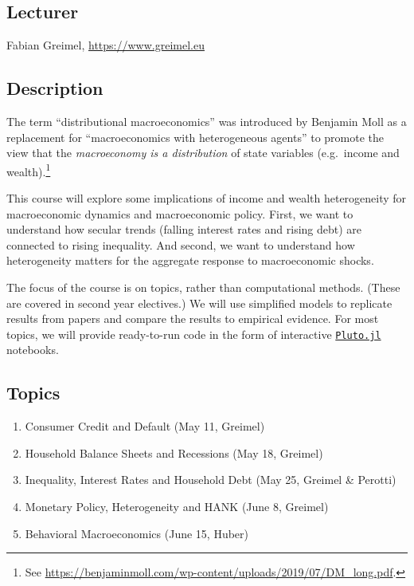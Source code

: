 \documentclass[a4paper,12pt]{article}
\begin{document}

\medskip {}

\subsection*{Lecturer}

Fabian Greimel, \url{https://www.greimel.eu}


\subsection*{Description}

The term ``distributional macroeconomics'' was introduced by Benjamin Moll as a replacement for ``macroeconomics with heterogeneous agents'' to promote the view that the \emph{macroeconomy is a distribution} of state variables (e.g.\ income and wealth).\footnote{See \url{ https://benjaminmoll.com/wp-content/uploads/2019/07/DM_long.pdf}.}

This course will explore some implications of income and wealth heterogeneity for macroeconomic dynamics and macroeconomic policy. First, we want to understand how secular trends (falling interest rates and rising debt) are connected to rising inequality. And second, we want to understand how heterogeneity matters for the aggregate response to macroeconomic shocks.

The focus of the course is on topics, rather than computational methods. (These are covered in second year electives.) We will use simplified models to replicate results from papers and compare the results to empirical evidence. For most topics, we will provide ready-to-run code in the form of interactive \href{https://github.com/fonsp/Pluto.jl}{\texttt{Pluto.jl}} notebooks. 


\subsection*{Topics}

\begin{enumerate}
\item Consumer Credit and Default (May 11, Greimel)
\item Household Balance Sheets and Recessions (May 18, Greimel)
\item Inequality, Interest Rates and Household Debt (May 25, Greimel \& Perotti)
\item Monetary Policy, Heterogeneity and HANK (June 8, Greimel)
\item Behavioral Macroeconomics (June 15, Huber)
\end{enumerate}
\end{document}
